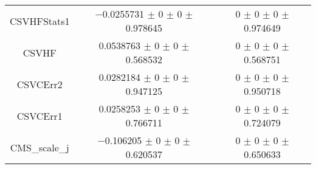 \begin{table}
\begin{tabular}{ccc}
CSVHFStats1 & \num{-0.0255731} $\pm$ \num{0} $\pm$ \num{0} $\pm$ \num{0.978645} & \num{0} $\pm$ \num{0} $\pm$ \num{0} $\pm$ \num{0.974649}\\
CSVHF & \num{0.0538763} $\pm$ \num{0} $\pm$ \num{0} $\pm$ \num{0.568532} & \num{0} $\pm$ \num{0} $\pm$ \num{0} $\pm$ \num{0.568751}\\
CSVCErr2 & \num{0.0282184} $\pm$ \num{0} $\pm$ \num{0} $\pm$ \num{0.947125} & \num{0} $\pm$ \num{0} $\pm$ \num{0} $\pm$ \num{0.950718}\\
CSVCErr1 & \num{0.0258253} $\pm$ \num{0} $\pm$ \num{0} $\pm$ \num{0.766711} & \num{0} $\pm$ \num{0} $\pm$ \num{0} $\pm$ \num{0.724079}\\
CMS\_scale\_j & \num{-0.106205} $\pm$ \num{0} $\pm$ \num{0} $\pm$ \num{0.620537} & \num{0} $\pm$ \num{0} $\pm$ \num{0} $\pm$ \num{0.650633}\\
\bottomrule
\end{tabular}
\end{table}